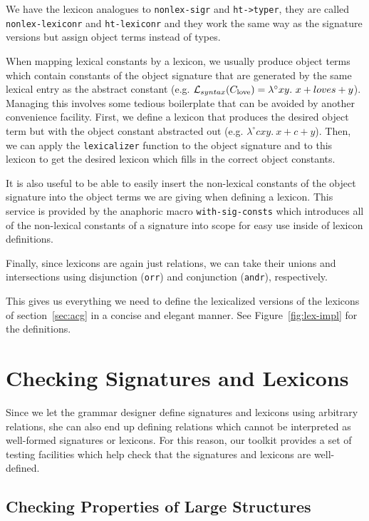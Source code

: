 We have the lexicon analogues to \texttt{nonlex-sigr} and
\texttt{ht->typer}, they are called \texttt{nonlex-lexiconr} and
\texttt{ht-lexiconr} and they work the same way as the signature
versions but assign object terms instead of types.

When mapping lexical constants by a lexicon, we usually produce object
terms which contain constants of the object signature that are generated
by the same lexical entry as the abstract constant
(e.g. $\mathcal{L}_{syntax}(C_{\textrm{love}}) = \lambda^{\circ} x y.\ x +
loves + y$). Managing this involves some tedious boilerplate that can be
avoided by another convenience facility. First, we define a lexicon that
produces the desired object term but with the object constant abstracted
out (e.g. $\lambda^{\circ} c x y.\ x + c + y$). Then, we can apply the
\texttt{lexicalizer} function to the object signature and to this
lexicon to get the desired lexicon which fills in the correct object
constants.

It is also useful to be able to easily insert the non-lexical constants
of the object signature into the object terms we are giving when
defining a lexicon. This service is provided by the anaphoric macro
\texttt{with-sig-consts} which introduces all of the non-lexical
constants of a signature into scope for easy use inside of lexicon
definitions.

Finally, since lexicons are again just relations, we can take their
unions and intersections using disjunction (\texttt{orr}) and
conjunction (\texttt{andr}), respectively.

This gives us everything we need to define the lexicalized versions of
the lexicons of section~\ref{sec:acg} in a concise and elegant
manner. See Figure~\ref{fig:lex-impl} for the definitions.


\section{Checking Signatures and Lexicons}

Since we let the grammar designer define signatures and lexicons using
arbitrary relations, she can also end up defining relations which cannot
be interpreted as well-formed signatures or lexicons. For this reason,
our toolkit provides a set of testing facilities which help check that
the signatures and lexicons are well-defined.

\subsection{Checking Properties of Large Structures}


